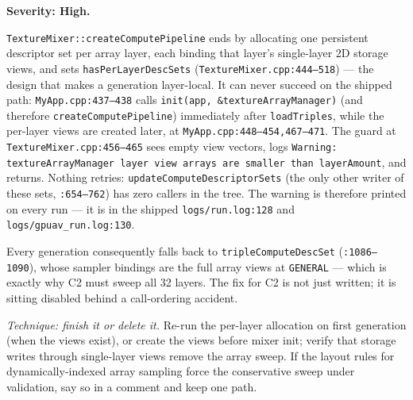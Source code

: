 \documentclass[11pt,a4paper]{article}
\begin{document}
\textbf{Severity: High.}

\texttt{TextureMixer::createComputePipeline} ends by allocating one persistent
descriptor set per array layer, each binding that layer's single-layer 2D
storage views, and sets \texttt{hasPerLayerDescSets}
(\texttt{TextureMixer.cpp:444--518}) --- the design that makes a generation
layer-local. It can never succeed on the shipped path: \texttt{MyApp.cpp:437--438}
calls \texttt{init(app, \&textureArrayManager)} (and therefore
\texttt{createComputePipeline}) immediately after \texttt{loadTriples}, while
the per-layer views are created later, at \texttt{MyApp.cpp:448--454,467--471}.
The guard at \texttt{TextureMixer.cpp:456--465} sees empty view vectors, logs
\texttt{Warning: textureArrayManager layer view arrays are smaller than
layerAmount}, and returns. Nothing retries: \texttt{updateComputeDescriptorSets}
(the only other writer of these sets, \texttt{:654--762}) has zero callers in
the tree. The warning is therefore printed on every run --- it is in the shipped
\texttt{logs/run.log:128} and \texttt{logs/gpuav\_run.log:130}.

Every generation consequently falls back to \texttt{tripleComputeDescSet}
(\texttt{:1086--1090}), whose sampler bindings are the full array views at
\texttt{GENERAL} --- which is exactly why C2 must sweep all 32 layers. The fix
for C2 is not just written; it is sitting disabled behind a call-ordering
accident.

\textit{Technique: finish it or delete it.} Re-run the per-layer allocation on
first generation (when the views exist), or create the views before mixer
init; verify that storage writes through single-layer views remove the array
sweep. If the layout rules for dynamically-indexed array sampling force the
conservative sweep under validation, say so in a comment and keep one path.
\end{document}
